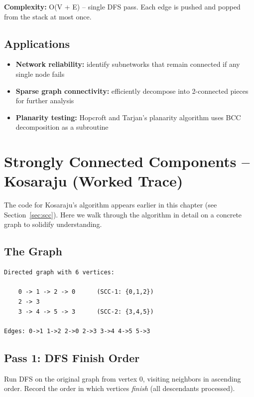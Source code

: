 \textbf{Complexity:} O(V + E) -- single DFS pass. Each edge is pushed and popped from the stack at most once.

\subsection{Applications}

\begin{itemize}
\item \textbf{Network reliability:} identify subnetworks that remain connected if any single node fails
\item \textbf{Sparse graph connectivity:} efficiently decompose into 2-connected pieces for further analysis
\item \textbf{Planarity testing:} Hopcroft and Tarjan's planarity algorithm uses BCC decomposition as a subroutine
\end{itemize}

\section{Strongly Connected Components -- Kosaraju (Worked Trace)}

The code for Kosaraju's algorithm appears earlier in this chapter (see Section~\ref{sec:scc}). Here we walk through the algorithm in detail on a concrete graph to solidify understanding.

\subsection{The Graph}

\begin{lstlisting}
Directed graph with 6 vertices:

    0 -> 1 -> 2 -> 0      (SCC-1: {0,1,2})
    2 -> 3
    3 -> 4 -> 5 -> 3      (SCC-2: {3,4,5})

Edges: 0->1 1->2 2->0 2->3 3->4 4->5 5->3
\end{lstlisting}

\subsection{Pass 1: DFS Finish Order}

Run DFS on the original graph from vertex 0, visiting neighbors in ascending order. Record the order in which vertices \emph{finish} (all descendants processed).

